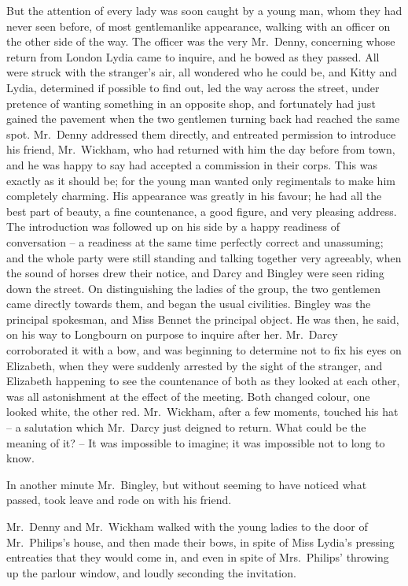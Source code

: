 But the attention of every lady was soon caught by
a young man, whom they had never seen before, of most
gentlemanlike appearance, walking with an officer on the
other side of the way. The officer was the very Mr.\ Denny,
concerning whose return from London Lydia came to
inquire, and he bowed as they passed. All were struck
with the stranger’s air, all wondered who he could be, and
Kitty and Lydia, determined if possible to find out, led
the way across the street, under pretence of wanting
something in an opposite shop, and fortunately had just
gained the pavement when the two gentlemen turning
back had reached the same spot. Mr.\ Denny addressed
them directly, and entreated permission to introduce his
friend, Mr.\ Wickham, who had returned with him the day
before from town, and he was happy to say had accepted
a commission in their corps. This was exactly as it should
be; for the young man wanted only regimentals to make
him completely charming. His appearance was greatly
in his favour; he had all the best part of beauty, a fine
countenance, a good figure, and very pleasing address.
The introduction was followed up on his side by a happy
readiness of conversation -- a readiness at the same time
perfectly correct and unassuming; and the whole party
were still standing and talking together very agreeably,
when the sound of horses drew their notice, and Darcy
and Bingley were seen riding down the street. On distinguishing
the ladies of the group, the two gentlemen
came directly towards them, and began the usual civilities.
Bingley was the principal spokesman, and Miss Bennet the
principal object. He was then, he said, on his way to
Longbourn on purpose to inquire after her. Mr.\ Darcy
corroborated it with a bow, and was beginning to determine
not to fix his eyes on Elizabeth, when they were
suddenly arrested by the sight of the stranger, and
Elizabeth happening to see the countenance of both as
they looked at each other, was all astonishment at the
effect of the meeting. Both changed colour, one looked
white, the other red. Mr.\ Wickham, after a few moments,
touched his hat -- a salutation which Mr.\ Darcy just
deigned to return. What could be the meaning of it? -- It
was impossible to imagine; it was impossible not to
long to know.

In another minute Mr.\ Bingley, but without seeming
to have noticed what passed, took leave and rode on with
his friend.

Mr.\ Denny and Mr.\ Wickham walked with the young
ladies to the door of Mr.\ Philips’s house, and then made
their bows, in spite of Miss Lydia’s pressing entreaties
that they would come in, and even in spite of Mrs.\ Philips’
throwing up the parlour window, and loudly seconding the
invitation.

